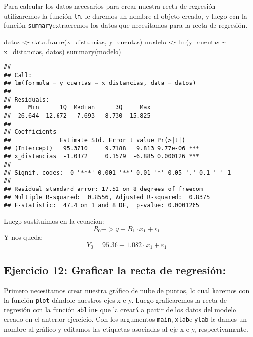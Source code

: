 \documentclass[
]{article}
\newenvironment{Shaded}{\begin{snugshade}}{\end{snugshade}}
\newcommand{\FunctionTok}[1]{\textcolor[rgb]{0.00,0.00,0.00}{#1}}
\newcommand{\NormalTok}[1]{#1}
\newcommand{\OtherTok}[1]{\textcolor[rgb]{0.56,0.35,0.01}{#1}}
\newcommand{\SpecialCharTok}[1]{\textcolor[rgb]{0.00,0.00,0.00}{#1}}
\begin{document}
Para calcular los datos necesarios para crear nuestra recta de regresión
utilizaremos la función \texttt{lm}, le daremos un nombre al objeto
creado, y luego con la función \texttt{summary}extraeremos los datos que
necesitamos para la recta de regresión.

\begin{Shaded}
\begin{Highlighting}[]
\NormalTok{datos }\OtherTok{\textless{}{-}} \FunctionTok{data.frame}\NormalTok{(x\_distancias, y\_cuentas)}
\NormalTok{modelo }\OtherTok{\textless{}{-}} \FunctionTok{lm}\NormalTok{(y\_cuentas }\SpecialCharTok{\textasciitilde{}}\NormalTok{ x\_distancias, datos)}
\FunctionTok{summary}\NormalTok{(modelo)}
\end{Highlighting}
\end{Shaded}

\begin{verbatim}
## 
## Call:
## lm(formula = y_cuentas ~ x_distancias, data = datos)
## 
## Residuals:
##     Min      1Q  Median      3Q     Max 
## -26.644 -12.672   7.693   8.730  15.825 
## 
## Coefficients:
##              Estimate Std. Error t value Pr(>|t|)    
## (Intercept)   95.3710     9.7188   9.813 9.77e-06 ***
## x_distancias  -1.0872     0.1579  -6.885 0.000126 ***
## ---
## Signif. codes:  0 '***' 0.001 '**' 0.01 '*' 0.05 '.' 0.1 ' ' 1
## 
## Residual standard error: 17.52 on 8 degrees of freedom
## Multiple R-squared:  0.8556, Adjusted R-squared:  0.8375 
## F-statistic:  47.4 on 1 and 8 DF,  p-value: 0.0001265
\end{verbatim}

Luego sustituimos en la ecuación: \[B_0 -> y - B_1 · x_1 + ε_1\] Y nos
queda: \[Y_0 = 95.36 - 1.082 · x_1 + ε_1\]

\hypertarget{ejercicio-12-graficar-la-recta-de-regresiuxf3n}{%
\subsection{Ejercicio 12: Graficar la recta de
regresión:}\label{ejercicio-12-graficar-la-recta-de-regresiuxf3n}}

Primero necesitamos crear nuestra gráfico de nube de puntos, lo cual
haremos con la función \texttt{plot} dándole nuestros ejes x e y. Luego
graficaremos la recta de regresión con la función \texttt{abline} que la
creará a partir de los datos del modelo creado en el anterior ejercicio.
Con los argumentos \texttt{main}, \texttt{xlab}e \texttt{ylab} le damos
un nombre al gráfico y editamos las etiquetas asociadas al eje x e y,
respectivamente.
\end{document}
